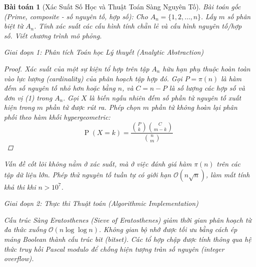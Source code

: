 \documentclass{article}
\newtheorem{baitoan}{Bài toán}
\begin{document}


\begin{baitoan}[Xác Suất Số Học và Thuật Toán Sàng Nguyên Tố]
 \emph{Bài toán gốc (Prime, composite - số nguyên tố, hợp số):} 
 Cho $A_n = \{1,2,\ldots,n\}$. Lấy $m$ số phân biệt từ $A_n$. Tính xác suất các cấu hình tính chẵn lẻ và cấu hình nguyên tố/hợp số. Viết chương trình mô phỏng.

\vspace{0.5em}\noindent\emph{Giai đoạn 1: Phân tích Toán học Lý thuyết (Analytic Abstraction)}
 
 \begin{proof}
 Xác suất của một sự kiện tổ hợp trên tập $A_n$ hữu hạn phụ thuộc hoàn toàn vào lực lượng (cardinality) của phân hoạch tập hợp đó. Gọi $P = \pi(n)$ là hàm đếm số nguyên tố nhỏ hơn hoặc bằng $n$, và $C = n - P$ là số lượng các hợp số và đơn vị (1) trong $A_n$. Gọi $X$ là biến ngẫu nhiên đếm số phần tử nguyên tố xuất hiện trong $m$ phần tử được rút ra. Phép chọn $m$ phần tử không hoàn lại phân phối theo hàm khối hypergeometric:
 \begin{equation}
 \operatorname{P}(X = k) = \frac{\binom{P}{k} \binom{C}{m-k}}{\binom{n}{m}}
 \end{equation}
 \end{proof}
 Vấn đề cốt lõi không nằm ở xác suất, mà ở việc đánh giá hàm $\pi(n)$ trên các tập dữ liệu lớn. Phép thử nguyên tố tuần tự có giới hạn $\mathcal{O}(n\sqrt{n})$, làm mất tính khả thi khi $n > 10^7$.

\vspace{0.5em}\noindent\emph{Giai đoạn 2: Thực thi Thuật toán (Algorithmic Implementation)}
 
 Cấu trúc Sàng Eratosthenes (Sieve of Eratosthenes) giảm thời gian phân hoạch từ đa thức xuống $\mathcal{O}(n \log \log n)$. Không gian bộ nhớ được tối ưu bằng cách ép mảng Boolean thành cấu trúc bit (bitset). Các tổ hợp chập được tính thông qua hệ thức truy hồi Pascal modulo để chống hiện tượng tràn số nguyên (integer overflow).


\end{baitoan}
\end{document}
